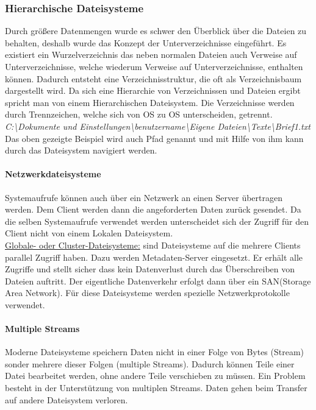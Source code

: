 \subsubsection{Hierarchische Dateisysteme}
Durch größere Datenmengen wurde es schwer den Überblick über die Dateien zu behalten, deshalb wurde das Konzept der Unterverzeichnisse eingeführt. Es existiert ein Wurzelverzeichnis das neben normalen Dateien auch Verweise auf Unterverzeichnisse, welche wiederum Verweise auf Unterverzeichnisse, enthalten können. Dadurch entsteht eine Verzeichnisstruktur, die oft als Verzeichnisbaum dargestellt wird. Da sich eine Hierarchie von Verzeichnissen und Dateien ergibt spricht man von einem Hierarchischen Dateisystem. Die Verzeichnisse werden durch Trennzeichen, welche sich von OS zu OS unterscheiden, getrennt. \\[3mm]
\textit{C:\textbackslash Dokumente und Einstellungen\textbackslash benutzername\textbackslash Eigene Dateien\textbackslash Texte\textbackslash Brief1.txt}
\\[3mm]
Das oben gezeigte Beispiel wird auch Pfad genannt und mit Hilfe von ihm kann durch das Dateisystem navigiert werden.
\paragraph{Netzwerkdateisysteme}
Systemaufrufe können auch über ein Netzwerk an einen Server übertragen werden. Dem Client werden dann die angeforderten Daten zurück gesendet. Da die selben Systemaufrufe verwendet werden unterscheidet sich der Zugriff für den Client nicht von einem Lokalen Dateisystem. \\[3mm]
\uline{Globale- oder Cluster-Dateisysteme:} sind Dateisysteme auf die mehrere Clients parallel Zugriff haben. Dazu werden Metadaten-Server eingesetzt. Er erhält alle Zugriffe und stellt sicher dass kein Datenverlust durch das Überschreiben von Dateien auftritt. Der eigentliche Datenverkehr erfolgt dann über ein SAN(Storage Area Network). Für diese Dateisysteme werden spezielle Netzwerkprotokolle verwendet.
\paragraph{Multiple Streams}
Moderne Dateisysteme speichern Daten nicht in einer Folge von Bytes (Stream) sonder mehrere dieser Folgen (multiple Streams). Dadurch können Teile einer Datei bearbeitet werden, ohne andere Teile verschieben zu müssen. Ein Problem besteht in der Unterstützung von multiplen Streams. Daten gehen beim Transfer auf andere Dateisystem verloren.
